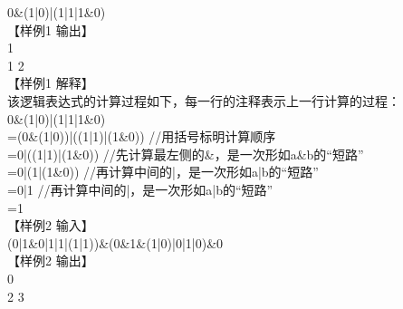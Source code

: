 \documentclass[12pt,twiside,a4paper]{ctexbook}
\numberwithin{chapter}{part}
\begin{document}
0\&(1|0)|(1|1|1\&0)\\
【样例1 输出】\\
1\\
1 2\\
【样例1 解释】\\
该逻辑表达式的计算过程如下，每一行的注释表示上一行计算的过程：\\
0\&(1|0)|(1|1|1\&0)\\
=(0\&(1|0))|((1|1)|(1\&0)) //用括号标明计算顺序\\
=0|((1|1)|(1\&0)) //先计算最左侧的\&，是一次形如a\&b的“短路”\\
=0|(1|(1\&0)) //再计算中间的|，是一次形如a|b的“短路”\\
=0|1 //再计算中间的|，是一次形如a|b的“短路”\\
=1\\
【样例2 输入】\\
(0|1\&0|1|1|(1|1))\&(0\&1\&(1|0)|0|1|0)\&0\\
【样例2 输出】\\
0\\
2 3
\end{document}
